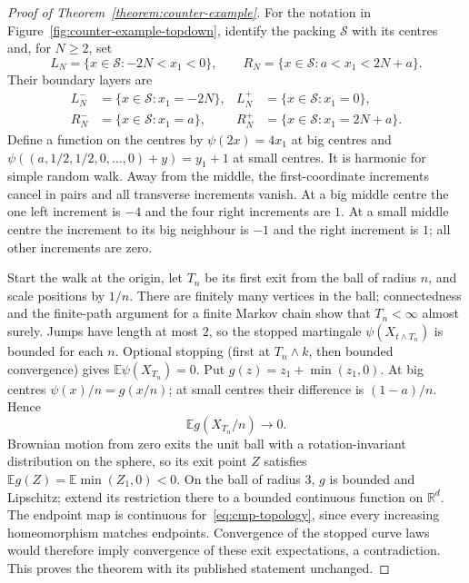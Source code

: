 \documentclass[12pt]{amsart}
\numberwithin{equation}{section}
\newcommand*{\Rd}{\ensuremath{\mathbb{R}^d}}
\begin{document}
\begin{proof}[Proof of Theorem~\ref{theorem:counter-example}]
For the notation in Figure~\ref{fig:counter-example-topdown}, identify the packing $\mathcal S$ with its centres and, for $N\geq2$, set
\begin{equation}\label{eq:def-of-ln}
 L_N=\{x\in\mathcal S:-2N<x_1<0\},\qquad
 R_N=\{x\in\mathcal S:a<x_1<2N+a\}.
\end{equation}
Their boundary layers are
\begin{equation}\label{eq:def-of-lnp}
 \begin{aligned}
 L_N^-&=\{x\in\mathcal S:x_1=-2N\},&L_N^+&=\{x\in\mathcal S:x_1=0\},\\
 R_N^-&=\{x\in\mathcal S:x_1=a\},&R_N^+&=\{x\in\mathcal S:x_1=2N+a\}.
 \end{aligned}
\end{equation}
Define a function on the centres by $\psi(2x)=4x_1$ at big centres and $\psi((a,1/2,1/2,0,\ldots,0)+y)=y_1+1$ at small centres. It is harmonic for simple random walk. Away from the middle, the first-coordinate increments cancel in pairs and all transverse increments vanish. At a big middle centre the one left increment is $-4$ and the four right increments are $1$. At a small middle centre the increment to its big neighbour is $-1$ and the right increment is $1$; all other increments are zero.

Start the walk at the origin, let $T_n$ be its first exit from the ball of radius $n$, and scale positions by $1/n$. There are finitely many vertices in the ball; connectedness and the finite-path argument for a finite Markov chain show that $T_n<\infty$ almost surely. Jumps have length at most $2$, so the stopped martingale $\psi(X_{t\wedge T_n})$ is bounded for each $n$. Optional stopping (first at $T_n\wedge k$, then bounded convergence) gives $\mathbb E\psi(X_{T_n})=0$.
Put $g(z)=z_1+\min(z_1,0)$. At big centres $\psi(x)/n=g(x/n)$; at small centres their difference is $(1-a)/n$. Hence
\[
 \mathbb E g(X_{T_n}/n)\longrightarrow0.
\]
Brownian motion from zero exits the unit ball with a rotation-invariant distribution on the sphere, so its exit point $Z$ satisfies
$\mathbb E g(Z)=\mathbb E\min(Z_1,0)<0$.
On the ball of radius $3$, $g$ is bounded and Lipschitz; extend its restriction there to a bounded continuous function on $\Rd$. The endpoint map is continuous for~\eqref{eq:cmp-topology}, since every increasing homeomorphism matches endpoints. Convergence of the stopped curve laws would therefore imply convergence of these exit expectations, a contradiction. This proves the theorem with its published statement unchanged.
\end{proof}





{
  
  
}
\end{document}
